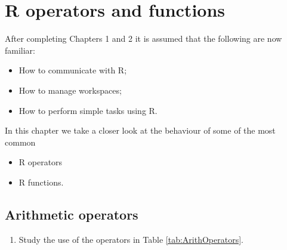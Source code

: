 \documentclass[
]{book}
\providecommand{\tightlist}{%
  \setlength{\itemsep}{0pt}\setlength{\parskip}{0pt}}
\begin{document}
\chapter{R operators and functions}\label{operators}

After completing Chapters 1 and 2 it is assumed that the following are now familiar:

\begin{itemize}
\tightlist
\item
  How to communicate with R;
\item
  How to manage workspaces;
\item
  How to perform simple tasks using R.
\end{itemize}

In this chapter we take a closer look at the behaviour of some of the most common

\begin{itemize}
\tightlist
\item
  R operators
\item
  R functions.
\end{itemize}

\section{Arithmetic operators}\label{arithmetic-operators}

\begin{enumerate}
\def\labelenumi{(\alph{enumi})}
\tightlist
\item
  Study the use of the operators in Table \ref{tab:ArithOperators}.
\end{enumerate}
\end{document}

